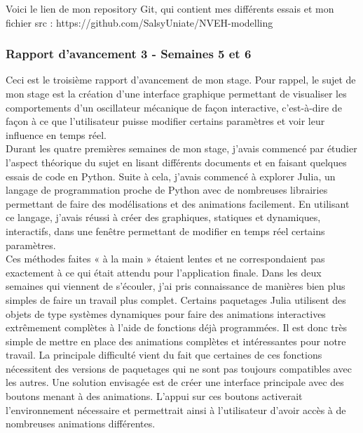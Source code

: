 \documentclass[a4paper, french, 12pt, titlepage]{article}
\begin{document}
Voici le lien de mon repository Git, qui contient mes différents essais et mon fichier src : https://github.com/SalsyUniate/NVEH-modelling



\subsubsection*{Rapport d'avancement 3 - Semaines 5 et 6}

Ceci est le troisième rapport d'avancement de mon stage. Pour rappel, le sujet de mon stage est la création d'une interface graphique permettant de visualiser les comportements d'un oscillateur mécanique de façon interactive, c'est-à-dire de façon à ce que l'utilisateur puisse modifier certains paramètres et voir leur influence en temps réel. \\

Durant les quatre premières semaines de mon stage, j'avais commencé par étudier l'aspect théorique du sujet en lisant différents documents et en faisant quelques essais de code en Python. Suite à cela, j'avais commencé à explorer Julia, un langage de programmation proche de Python avec de nombreuses librairies permettant de faire des modélisations et des animations facilement. En utilisant ce langage, j'avais réussi à créer des graphiques, statiques et dynamiques, interactifs, dans une fenêtre permettant de modifier en temps réel certains paramètres. \\

Ces méthodes faites « à la main » étaient lentes et ne correspondaient pas exactement à ce qui était attendu pour l'application finale. Dans les deux semaines qui viennent de s'écouler, j'ai pris connaissance de manières bien plus simples de faire un travail plus complet. Certains paquetages Julia utilisent des objets de type systèmes dynamiques pour faire des animations interactives extrêmement complètes à l'aide de fonctions déjà programmées. Il est donc très simple de mettre en place des animations complètes et intéressantes pour notre travail. La principale difficulté vient du fait que certaines de ces fonctions nécessitent des versions de paquetages qui ne sont pas toujours compatibles avec les autres. Une solution envisagée est de créer une interface principale avec des boutons menant à des animations. L'appui sur ces boutons activerait l'environnement nécessaire et permettrait ainsi à l'utilisateur d'avoir accès à de nombreuses animations différentes. \\
\end{document}
